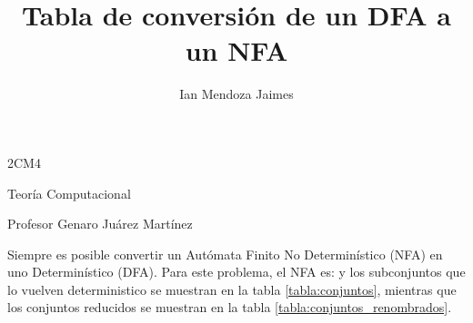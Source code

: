 \documentclass[12pt]{article}
\title{Tabla de conversión de un DFA a un NFA}
\author{Ian Mendoza Jaimes}
\date{}
\begin{document}
\maketitle
\begin{center}
\large
2CM4

Teoría Computacional 

Profesor Genaro Juárez Martínez
\end{center}

\vspace{6em}

Siempre es posible convertir un Autómata Finito No Determinístico (NFA) en uno Determinístico (DFA). Para este problema, el NFA es: y los subconjuntos que lo vuelven deterministico se muestran en la tabla \ref{tabla:conjuntos}, mientras que los conjuntos reducidos se muestran en la tabla \ref{tabla:conjuntos_renombrados}.\\
\end{document}
